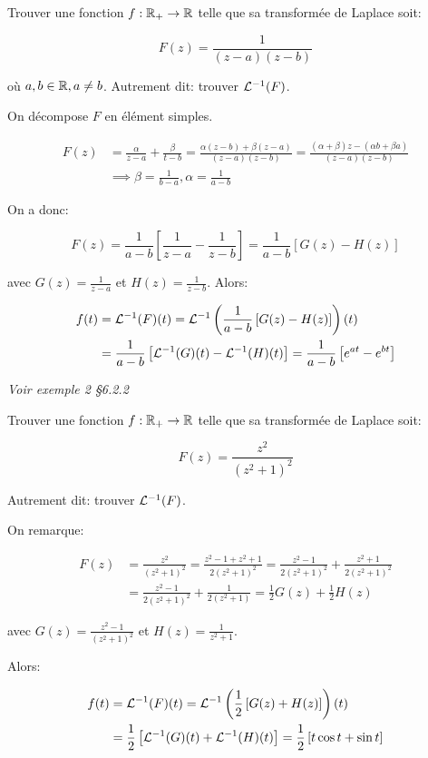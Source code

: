 \begin{example}[1]
    Trouver une fonction $f: \mathbb{R}_+ \rightarrow \mathbb{R}$ telle que sa transformée de Laplace soit:
    
    \[ F(z) = \frac{1}{(z-a)(z-b)} \]
    
    où $a, b \in \mathbb{R}, a \neq b$.
    Autrement dit: trouver $\mathcal{L}^{-1}(F)$.
    
    On décompose $F$ en élément simples.
    
    \begin{align*}
        F(z) &= \frac{\alpha}{z - a} + \frac{\beta}{t - b}
        = \frac{\alpha (z - b) + \beta (z-a)}{(z-a)(z-b)}
        = \frac{(\alpha + \beta) z - (\alpha b + \beta a)}{(z-a)(z-b)}
        \\&\implies \beta = \frac{1}{b - a}, \alpha = \frac{1}{a - b}
    \end{align*}
    
    On a donc:
    
    \[ F(z) = \frac{1}{a - b} \left[\frac{1}{z - a} - \frac{1}{z - b}\right] = \frac{1}{a - b} \left[G(z) - H(z)\right] \]
    
    avec $G(z) = \frac{1}{z - a}$ et $H(z) = \frac{1}{z - b}$.
    Alors:
    
    \begin{align*}
        f(t) &= \mathcal{L}^{-1}(F)(t)
        = \mathcal{L}^{-1}\left(\frac{1}{a - b} \left[G(z) - H(z)\right]\right)(t)
        \\&= \frac{1}{a - b} \left[ \mathcal{L}^{-1}(G)(t) - \mathcal{L}^{-1}(H)(t) \right]
        = \frac{1}{a - b} \left[ e^{at} - e^{bt} \right]
    \end{align*}
    
    \textit{Voir exemple 2 §6.2.2}
\end{example}


\begin{example}[2]
    Trouver une fonction $f: \mathbb{R}_+ \rightarrow \mathbb{R}$ telle que sa transformée de Laplace soit:
    
    \[ F(z) = \frac{z^2}{(z^2+1)^2} \]
    
    Autrement dit: trouver $\mathcal{L}^{-1}(F)$.
    
    On remarque:
    
    \begin{align*}
    F(z) &= \frac{z^2}{(z^2+1)^2}
    = \frac{z^2 - 1 + z^2 + 1}{2(z^2+1)^2}
    = \frac{z^2 - 1}{2(z^2+1)^2} + \frac{z^2 + 1}{2(z^2+1)^2}
    \\&= \frac{z^2 - 1}{2(z^2+1)^2} + \frac{1}{2(z^2+1)}
    = \frac{1}{2} G(z) + \frac{1}{2} H(z)
    \end{align*}
    
    avec $G(z) = \frac{z^2 - 1}{(z^2+1)^2}$ et $H(z) = \frac{1}{z^2+1}$.
    
    Alors:
    
    \begin{align*}
    f(t) &= \mathcal{L}^{-1}(F)(t)
    = \mathcal{L}^{-1}\left(\frac{1}{2} \left[G(z) + H(z)\right]\right)(t)
    \\&= \frac{1}{2} \left[ \mathcal{L}^{-1}(G)(t) + \mathcal{L}^{-1}(H)(t) \right]
    = \frac{1}{2} \left[ t \cos t +  \sin t \right]
    \end{align*}
\end{example}


